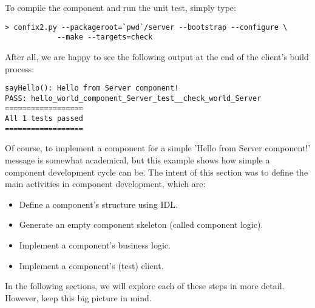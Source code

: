 \noindent
To compile the component and run the unit test, simply type: 
\begin{small}
\begin{verbatim}
> confix2.py --packageroot=`pwd`/server --bootstrap --configure \
            --make --targets=check
\end{verbatim}
\end{small}

\noindent
After all, we are happy to see the following output at the end of the client's
build process:

\begin{small}
\begin{verbatim}
sayHello(): Hello from Server component!
PASS: hello_world_component_Server_test__check_world_Server
==================
All 1 tests passed
==================
\end{verbatim}
\end{small}

\noindent
Of course, to implement a component for a simple 'Hello from Server component!'
message is somewhat academical, but this example shows how simple a component
development cycle can be. 
The intent of this section was to define the main activities in component 
development, which are:
\begin{itemize}
\item Define a component's structure using IDL.
\item Generate an empty component skeleton (called component logic).
\item Implement a component's business logic. 
\item Implement a component's (test) client.
\end{itemize}

\noindent
In the following sections, we will explore each of these steps in more
detail. However, keep this big picture in mind. 

